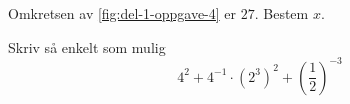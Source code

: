 Omkretsen av \cref{fig:del-1-oppgave-4} er $27$. Bestem $x$.


\Oppgave[2] 

Skriv så enkelt som mulig
%
\begin{equation*}
  4^2 + 4^{-1} \cdot (2^3)^2 + \left( \frac{1}{2} \right)^{-3}
\end{equation*}


\Oppgave[2] 

